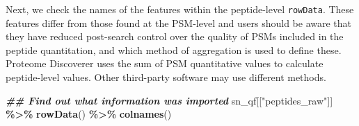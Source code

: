 \documentclass[9pt,a4paper,]{extarticle}
\newenvironment{Shaded}{\begin{snugshade}}{\end{snugshade}}
\newcommand{\DocumentationTok}[1]{\textcolor[rgb]{0.56,0.35,0.01}{\textbf{\textit{#1}}}}
\newcommand{\FunctionTok}[1]{\textcolor[rgb]{0.13,0.29,0.53}{\textbf{#1}}}
\newcommand{\NormalTok}[1]{#1}
\newcommand{\SpecialCharTok}[1]{\textcolor[rgb]{0.81,0.36,0.00}{\textbf{#1}}}
\newcommand{\StringTok}[1]{\textcolor[rgb]{0.31,0.60,0.02}{#1}}
\begin{document}
Next, we check the names of the features within the peptide-level \texttt{rowData}.
These features differ from those found at the PSM-level and users should be
aware that they have reduced post-search control over the quality of PSMs
included in the peptide quantitation, and which method of aggregation is used to
define these. Proteome Discoverer uses the sum of PSM quantitative values to
calculate peptide-level values. Other third-party software may use different
methods.

\begin{Shaded}
\begin{Highlighting}[]
\DocumentationTok{\#\# Find out what information was imported}
\NormalTok{sn\_qf[[}\StringTok{"peptides\_raw"}\NormalTok{]] }\SpecialCharTok{\%\textgreater{}\%}
  \FunctionTok{rowData}\NormalTok{() }\SpecialCharTok{\%\textgreater{}\%}
  \FunctionTok{colnames}\NormalTok{()}
\end{Highlighting}
\end{Shaded}
\end{document}
